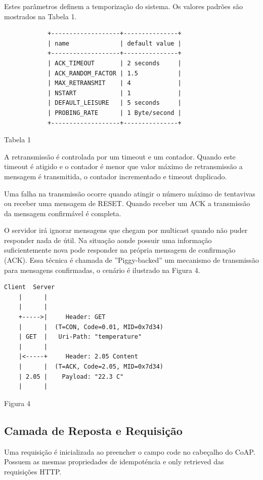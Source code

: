 Estes par\^ametros definem a temporiza\c{c}\~ao do sistema. Os valores padr\~oes s\~ao mostrados na Tabela 1.
\begin{center}
\begin{verbatim}
            +-------------------+---------------+
            | name              | default value |
            +-------------------+---------------+
            | ACK_TIMEOUT       | 2 seconds     |
            | ACK_RANDOM_FACTOR | 1.5           |
            | MAX_RETRANSMIT    | 4             |
            | NSTART            | 1             |
            | DEFAULT_LEISURE   | 5 seconds     |
            | PROBING_RATE      | 1 Byte/second |
            +-------------------+---------------+
\end{verbatim}
Tabela 1
\end{center}

A retransmiss\~ao \'e controlada por um timeout e um contador. Quando este timeout \'e atigido e o contador \'e menor que valor m\'aximo de retransmiss\~ao a mensagem \'e transmitida, o contador incrementado e timeout duplicado.

Uma falha na transmiss\~ao ocorre quando atingir o n\'umero m\'aximo de tentavivas ou receber uma mensagem de RESET. Quando receber um ACK a transmiss\~ao da mensagem confirm\'avel \'e completa.

O servidor ir\'a ignorar mensagens que chegam por multicast quando n\~ao puder responder nada de \'util.
Na situa\c{c}\~ao aonde possuir uma informa\c{c}\~ao suficientemente nova pode responder na pr\'opria mensagem de confirma\c{c}\~ao (ACK). Essa t\'ecnica \'e chamada de ''Piggy-backed'' um mecanismo de transmiss\~ao para mensagens confirmadas, o cen\'ario \'e ilustrado na Figura 4.\cite{draft-ietf-core-coap-18}

\begin{center}
\begin{verbatim}
Client  Server
    |      |
    |      |
    +----->|     Header: GET
    |      |  (T=CON, Code=0.01, MID=0x7d34)
    | GET  |   Uri-Path: "temperature"
    |      |
    |<-----+     Header: 2.05 Content
    |      |  (T=ACK, Code=2.05, MID=0x7d34)
    | 2.05 |    Payload: "22.3 C"
    |      |
\end{verbatim}
Figura 4
\end{center}

\subsection{Camada de Reposta e Requisi\c{c}\~ao}
Uma requisi\c{c}\~ao \'e inicializada ao preencher o campo code no cabe\c{c}alho do CoAP. Possuem as mesmas propriedades de idempot\'encia e only retrieved das requisi\c{c}\~oes HTTP.


